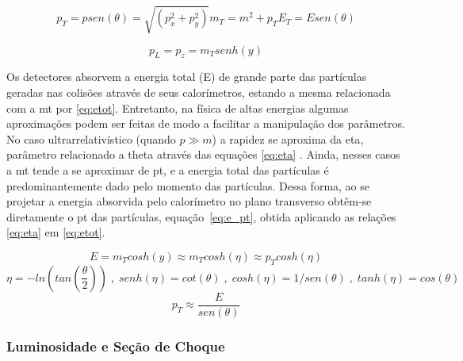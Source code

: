 \begin{subequations}\label{eq:proj_transv}
\begin{equation}\label{eq:pt}
p_T = p sen ( \theta ) = \sqrt{(p_x^2 + p_y^2)}
\end{equation}
\begin{equation}\label{eq:mt}
m_T = m^2 + p_T
\end{equation}
\begin{equation}\label{eq:Et}
E_T = E sen ( \theta )
\end{equation}
\end{subequations}

\begin{equation}\label{eq:pl}
p_L = p_z = m_T senh ( y )
\end{equation}

Os detectores absorvem a energia total (E) de grande parte das partículas
geradas nas colisões através de seus calorímetros, 
estando a mesma relacionada com a \gls{mt} por \ref{eq:etot}. Entretanto, na física de 
altas energias algumas aproximações podem
ser feitas de modo a facilitar a manipulação dos parâmetros. No caso ultrarrelativístico (quando $p \gg
m$) a rapidez se aproxima da \gls{eta}, parâmetro relacionado a \gls{theta}
através das equações \ref{eq:eta} \cite{pdg_book}.
Ainda, nesses casos a \gls{mt} tende a se aproximar de
\gls{pt}, e a energia total das partículas é predominantemente dado
pelo momento das partículas. Dessa forma, ao se projetar a energia absorvida
pelo calorímetro no plano transverso obtêm-se diretamente o \gls{pt} das
partículas, equação~\ref{eq:e_pt}, obtida aplicando as relações \ref{eq:eta} em \ref{eq:etot}.

\begin{equation}\label{eq:etot}
E = m_{T}cosh(y) \approx m_{T}cosh(\eta) \approx p_{T}cosh(\eta)
\end{equation}
\begin{equation}\label{eq:eta}
\eta = -ln \left( tan\left( \frac{\theta}{2} \right) \right) \;,\; senh(\eta) =
cot(\theta) \;,\;  cosh(\eta) = 1 / sen(\theta) \;,\; tanh(\eta) = cos(\theta) 
\end{equation}
\begin{equation}\label{eq:e_pt}
p_T \approx \frac{E}{sen(\theta)}
\end{equation}

\subsubsection{Luminosidade e Seção de Choque}


